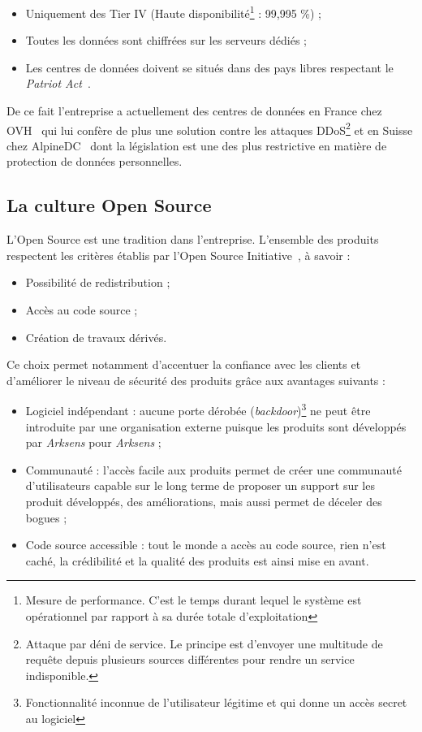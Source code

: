 \documentclass[a4paper,10pt, twoside]{report}
\begin{document}
\begin{spacing}{1.2}
\begin{itemize}
  \item Uniquement des Tier IV (Haute disponibilité\footnote{Mesure de
  performance. C'est le temps durant lequel le système est opérationnel par
  rapport à sa durée totale d'exploitation} : 99,995 \%) ;
  \item Toutes les données sont chiffrées sur les serveurs dédiés ;
  \item Les centres de données doivent se situés dans des pays libres
  respectant le \textit{Patriot Act}~\cite{refPatriotAct}.
\end{itemize}

De ce fait l'entreprise a actuellement des centres de données en France
chez OVH~\cite{refOVH} qui lui confère de plus une solution contre les
attaques DDoS\footnote{Attaque par déni de service. Le principe est d'envoyer
une multitude de requête depuis plusieurs sources différentes pour rendre
un service indisponible.} et en Suisse chez AlpineDC~\cite{refAlpineDC} dont la
législation est une des plus restrictive en matière de protection de
données personnelles.

\subsection{La culture Open Source}

L'Open Source est une tradition dans l'entreprise. L'ensemble des
produits respectent les critères établis par l'Open Source
Initiative~\cite{refOSI}, à savoir :

\begin{itemize}
  \item Possibilité de redistribution ;
  \item Accès au code source ;
  \item Création de travaux dérivés.
\end{itemize}

Ce choix permet notamment d'accentuer la confiance avec les clients et
d'améliorer le niveau de sécurité des produits grâce aux avantages
suivants :

\begin{itemize}
  \item Logiciel indépendant : aucune porte dérobée
  (\textit{backdoor})\footnote{Fonctionnalité inconnue de l'utilisateur
  légitime et qui donne un accès secret au logiciel} ne peut
  être introduite par une organisation externe puisque les produits sont
  développés par \textit{Arksens} pour \textit{Arksens} ;
  \item Communauté : l'accès facile aux produits permet de créer une
  communauté d'utilisateurs capable sur le long terme de proposer un
  support sur les produit développés, des améliorations, mais aussi
  permet de déceler des bogues ;
  \item Code source accessible : tout le monde a accès au code source,
  rien n'est caché, la crédibilité et la qualité des produits est ainsi
  mise en avant.
\end{itemize}


\end{spacing}
\end{document}
